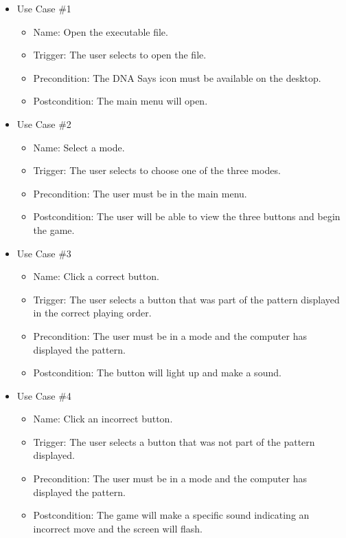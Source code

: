 \documentclass[12pt, titlepage]{article}
\begin{document}
\begin{itemize}

\item Use Case \#1
\begin{itemize}
\item Name: Open the executable file.
\item Trigger: The user selects to open the file.
\item Precondition: The DNA Says icon must be available on the desktop.
\item Postcondition: The main menu will open.
\end{itemize}

\item Use Case \#2
\begin{itemize}
\item Name: Select a mode.
\item Trigger: The user selects to choose one of the three modes.
\item Precondition: The user must be in the main menu.
\item Postcondition: The user will be able to view the three buttons and begin the game.
\end{itemize}

\item Use Case \#3
\begin{itemize}
\item Name: Click a correct button.
\item Trigger: The user selects a button that was part of the pattern displayed in the correct playing order. 
\item Precondition: The user must be in a mode and the computer has displayed the pattern.
\item Postcondition: The button will light up and make a sound.
\end{itemize}

\item Use Case \#4
\begin{itemize}
\item Name: Click an incorrect button.
\item Trigger: The user selects a button that was not part of the pattern displayed.
\item Precondition: The user must be in a mode and the computer has displayed the pattern.
\item Postcondition: The game will make a specific sound indicating an incorrect move and the screen will flash.
\end{itemize}


\end{itemize}
\end{document}
